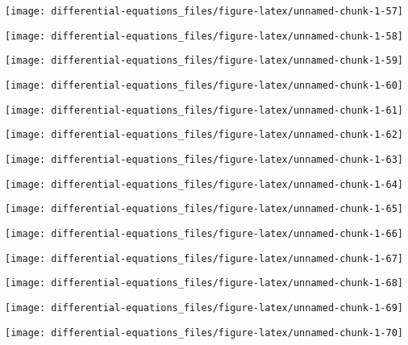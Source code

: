 \documentclass[]{tufte-handout}
\begin{document}
\begin{marginfigure}
\texttt{[image: differential-equations\_files/figure-latex/unnamed-chunk-1-57]} \end{marginfigure}
\begin{marginfigure}
\texttt{[image: differential-equations\_files/figure-latex/unnamed-chunk-1-58]} \end{marginfigure}
\begin{marginfigure}
\texttt{[image: differential-equations\_files/figure-latex/unnamed-chunk-1-59]} \end{marginfigure}
\begin{marginfigure}
\texttt{[image: differential-equations\_files/figure-latex/unnamed-chunk-1-60]} \end{marginfigure}
\begin{marginfigure}
\texttt{[image: differential-equations\_files/figure-latex/unnamed-chunk-1-61]} \end{marginfigure}
\begin{marginfigure}
\texttt{[image: differential-equations\_files/figure-latex/unnamed-chunk-1-62]} \end{marginfigure}
\begin{marginfigure}
\texttt{[image: differential-equations\_files/figure-latex/unnamed-chunk-1-63]} \end{marginfigure}
\begin{marginfigure}
\texttt{[image: differential-equations\_files/figure-latex/unnamed-chunk-1-64]} \end{marginfigure}
\begin{marginfigure}
\texttt{[image: differential-equations\_files/figure-latex/unnamed-chunk-1-65]} \end{marginfigure}
\begin{marginfigure}
\texttt{[image: differential-equations\_files/figure-latex/unnamed-chunk-1-66]} \end{marginfigure}
\begin{marginfigure}
\texttt{[image: differential-equations\_files/figure-latex/unnamed-chunk-1-67]} \end{marginfigure}
\begin{marginfigure}
\texttt{[image: differential-equations\_files/figure-latex/unnamed-chunk-1-68]} \end{marginfigure}
\begin{marginfigure}
\texttt{[image: differential-equations\_files/figure-latex/unnamed-chunk-1-69]} \end{marginfigure}
\begin{marginfigure}
\texttt{[image: differential-equations\_files/figure-latex/unnamed-chunk-1-70]} \end{marginfigure}
\end{document}

